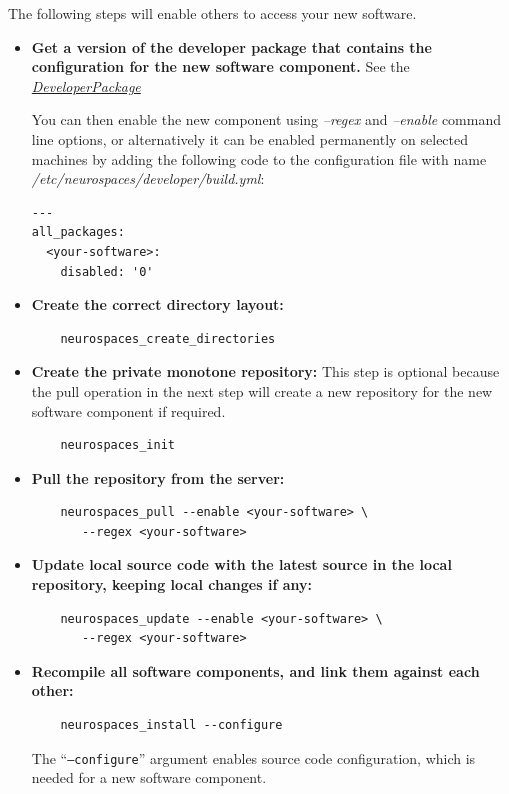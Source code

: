 \documentclass[12pt]{article}
\begin{document}
The following steps will enable others to access your new software.

\begin{itemize}

\item {\bf Get a version of the developer package that contains the
    configuration for the new software component.}  See
  the~\href{../developer-package/developer-package.tex}{\it
    DeveloperPackage}

  You can then enable the new component using {\it --regex} and {\it
    --enable} command line options, or alternatively it can be enabled
  permanently on selected machines by adding the following code to the
  configuration file with name {\it
    /etc/neurospaces/developer/build.yml}:

\begin{verbatim}
---
all_packages:
  <your-software>:
    disabled: '0'
\end{verbatim}


\item {\bf Create the correct directory layout:}
\begin{verbatim}
	neurospaces_create_directories
\end{verbatim}

\item {\bf Create the private monotone repository:} This step is
  optional because the pull operation in the next step will create a
  new repository for the new software component if required.
\begin{verbatim}
	neurospaces_init
\end{verbatim}

\item {\bf Pull the repository from the server:}
\begin{verbatim}
	neurospaces_pull --enable <your-software> \
	   --regex <your-software>
\end{verbatim}
  
\item {\bf Update local source code with the latest source in the
    local repository, keeping local changes if any:}
\begin{verbatim}
	neurospaces_update --enable <your-software> \
	   --regex <your-software>
\end{verbatim}
  
\item {\bf Recompile all software components, and link them against
    each other:}
\begin{verbatim}
	neurospaces_install --configure
\end{verbatim}
  The ``{\tt --configure}'' argument enables source code
  configuration, which is needed for a new software component.
\end{itemize}
\end{document}
